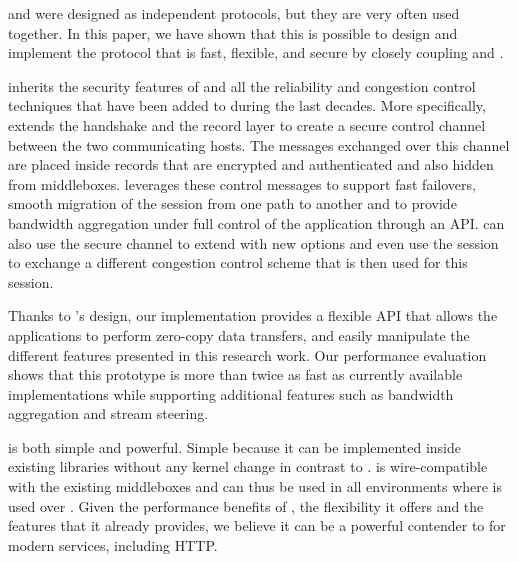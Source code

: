 \tcp and \tls were designed as independent protocols, but they are very often
used together. In this paper, we have shown that this is possible to design and
implement the \tcpls protocol that is fast, flexible, and secure by closely
coupling \tcp and \tls.

\tcpls inherits the security features of  and all the reliability and
congestion control techniques that have been added to \tcp during the last
decades. More specifically, \tcpls extends the  handshake and the record
layer to create a secure control channel between the two communicating hosts.
The messages exchanged over this channel are placed inside \tls records that are
encrypted and authenticated and also hidden from middleboxes. \tcpls leverages
these control messages to support fast failovers, smooth
migration of the \tcpls session from one path to another and to provide 
bandwidth aggregation under full control of the application through an API. 
\tcpls can also use the secure channel to extend \tcp with new options and even 
use the \tcpls session to exchange a different congestion control scheme that 
is then used for this session.

Thanks to \tcpls's design, our \tcpls implementation provides a
flexible API that allows the applications to perform zero-copy data transfers,
and easily manipulate the different features presented in this research work.
Our performance evaluation shows that this prototype is more than twice as fast
as currently available \quic implementations while supporting additional
features such as bandwidth aggregation and stream steering.

\tcpls is both simple and powerful. Simple because it can be implemented inside
existing \tls libraries without any kernel change in contrast to \tcp. \tcpls is
wire-compatible with the existing \tcp middleboxes and can thus be used in all
environments where \tls is used over \tcp. Given the performance benefits of
\tcpls, the flexibility it offers and the features that it already provides, we
believe it can be a powerful contender to \quic for modern services, including
HTTP.
